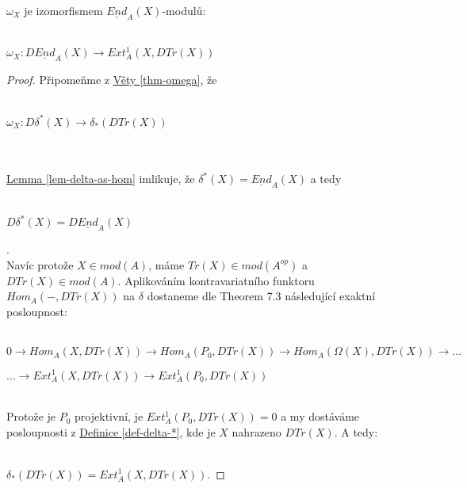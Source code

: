       \begin{thm}\label{thm-omega-x}
        $\omega_X$ je izomorfismem $\underline{End}_A(X)$-modulů: \\\\
        \centerline{$\omega_X: D\underline{End}_A(X) \rightarrow Ext_A^1(X,DTr(X))$}
      \end{thm}
      \begin{proof}
        Připomeňme z \hyperref[thm-omega]{Věty \ref*{thm-omega}}, že \\\\
        \centerline{$\omega_X: D\delta^*(X) \rightarrow\delta_*(DTr(X))$} \\\\
        \hyperref[lem-delta-as-hom]{Lemma \ref*{lem-delta-as-hom}} 
        imlikuje, že $\delta^*(X)=\underline{End}_A(X)$ a tedy \\\\
        \centerline{$D\delta^*(X)=D\underline{End}_A(X)$}. \\
        
        Navíc protože $X\in mod(A)$, máme $Tr(X)\in mod(A^{op})$ a $DTr(X)\in 
        mod(A)$.
        Aplikováním kontravariatního funktoru $Hom_A(-,DTr(X))$ na $\delta$ 
        dostaneme dle \cite{5} Theorem 7.3 následující exaktní 
        posloupnost: \\\\
        \centerline{$
          0\rightarrow 
          Hom_A(X,DTr(X))\rightarrow 
          Hom_A(P_0,DTr(X))\rightarrow
          Hom_A(\Omega(X),DTr(X))\rightarrow\ldots 
        $}
        \centerline{$
          \ldots\rightarrow 
          Ext^1_A(X,DTr(X))\rightarrow 
          Ext^1_A(P_0,DTr(X))
        $}\\
        
        Protože je $P_0$ projektivní, je $Ext_A^1(P_0,DTr(X))=0$ a my dostáváme 
        posloupnosti z \hyperref[def-delta-*]{Definice \ref*{def-delta-*}}, kde je $X$ 
        nahrazeno $DTr(X)$. A tedy: 
        \\\\
        \centerline{$\delta_*(DTr(X))=Ext^1_A(X,DTr(X))$.}
      \end{proof} 
    
